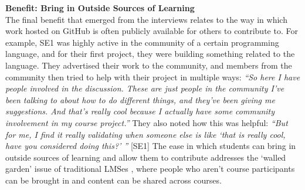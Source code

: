 \textbf{Benefit: Bring in Outside Sources of Learning} \\
The final benefit that emerged from the interviews relates to the way in which work hosted on GitHub is often publicly available for others to contribute to. For example, SE1 was highly active in the community of a certain programming language, and for their first project, they were building something related to the language. They advertised their work to the community, and members from the community then tried to help with their project in multiple ways: \textit{``So here I have people involved in the discussion. These are just people in the community I've been talking to about how to do different things, and they've been giving me suggestions. And that's really cool because I actually have some community involvement in my course project.''} They also noted how this was helpful: \textit{``But for me, I find it really validating when someone else is like `that is really cool, have you considered doing this?' ''} [SE1] The ease in which students can bring in outside sources of learning and allow them to contribute addresses the `walled garden' issue of traditional LMSes \cite{mott2010envisioning}, where people who aren't course participants can be brought in and content can be shared across courses.




